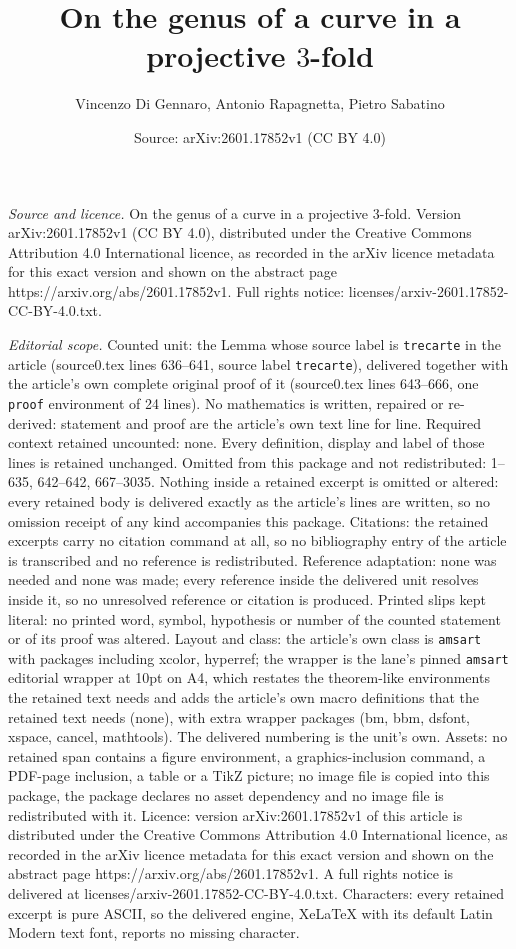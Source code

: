 \documentclass[10pt,a4paper]{amsart}
\title[On the genus of a curve in a projective $3$-fold]{On the genus of a curve in a projective $3$-fold}
\author{Vincenzo Di Gennaro, Antonio Rapagnetta, Pietro Sabatino}
\date{Source: arXiv:2601.17852v1 (CC BY 4.0)}
\begin{document}
\maketitle

\noindent\emph{Source and licence.} On the genus of a curve in a projective $3$-fold. Version arXiv:2601.17852v1 (CC BY 4.0), distributed under the Creative Commons Attribution 4.0 International licence, as recorded in the arXiv licence metadata for this exact version and shown on the abstract page https://arxiv.org/abs/2601.17852v1. Full rights notice: licenses/arxiv-2601.17852-CC-BY-4.0.txt.\par\smallskip

\noindent\textit{Editorial scope.} Counted unit: the Lemma whose source label is \texttt{trecarte} in the article (source0.tex lines 636--641, source label \texttt{trecarte}), delivered together with the article's own complete original proof of it (source0.tex lines 643--666, one \texttt{proof} environment of 24 lines). No mathematics is written, repaired or re-derived: statement and proof are the article's own text line for line. Required context retained uncounted: none. Every definition, display and label of those lines is retained unchanged. Omitted from this package and not redistributed: 1--635, 642--642, 667--3035. Nothing inside a retained excerpt is omitted or altered: every retained body is delivered exactly as the article's lines are written, so no omission receipt of any kind accompanies this package. Citations: the retained excerpts carry no citation command at all, so no bibliography entry of the article is transcribed and no reference is redistributed. Reference adaptation: none was needed and none was made; every reference inside the delivered unit resolves inside it, so no unresolved reference or citation is produced. Printed slips kept literal: no printed word, symbol, hypothesis or number of the counted statement or of its proof was altered. Layout and class: the article's own class is \texttt{amsart} with packages including xcolor, hyperref; the wrapper is the lane's pinned \texttt{amsart} editorial wrapper at 10pt on A4, which restates the theorem-like environments the retained text needs and adds the article's own macro definitions that the retained text needs (none), with extra wrapper packages (bm, bbm, dsfont, xspace, cancel, mathtools). The delivered numbering is the unit's own. Assets: no retained span contains a figure environment, a graphics-inclusion command, a PDF-page inclusion, a table or a TikZ picture; no image file is copied into this package, the package declares no asset dependency and no image file is redistributed with it. Licence: version arXiv:2601.17852v1 of this article is distributed under the Creative Commons Attribution 4.0 International licence, as recorded in the arXiv licence metadata for this exact version and shown on the abstract page https://arxiv.org/abs/2601.17852v1. A full rights notice is delivered at licenses/arxiv-2601.17852-CC-BY-4.0.txt. Characters: every retained excerpt is pure ASCII, so the delivered engine, XeLaTeX with its default Latin Modern text font, reports no missing character.
\end{document}
